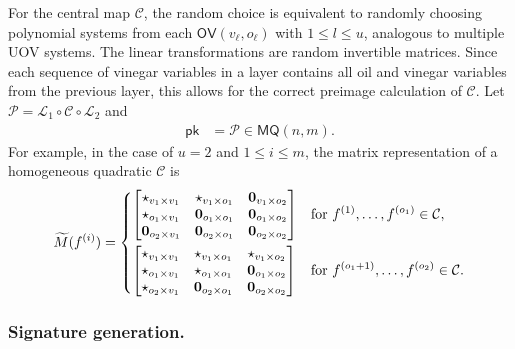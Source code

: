 \documentclass[12pt, a4paper, oneside]{memoir}
\theoremstyle{definition}
\begin{document}
For the central map $\mathcal{C}$, the random choice is equivalent to randomly choosing polynomial systems from each $\mathsf{OV}(v_{\ell}, o_{\ell})$ with $1 \leq l \leq u$, analogous to multiple UOV systems. The linear transformations are random invertible matrices. Since each sequence of vinegar variables in a layer contains all oil and vinegar variables from the previous layer, this allows for the correct preimage calculation of $\mathcal{C}$. Let $\mathcal{P} = \mathcal{L}_{1} \circ \mathcal{C} \circ \mathcal{L}_{2}$ and
\begin{align}\label{eq:pk-rainbow}
  \mathsf{pk} &= \mathcal{P} \in \mathsf{MQ}(n, m).
\end{align}
For example, in the case of $u = 2$ and $1 \leq i \leq m$, the matrix representation of a homogeneous quadratic $\mathcal{C}$ is
\begin{align}
  \widetilde{M}(f^{(i)}) =
  \begin{dcases}
    \begin{bmatrix}
      \star_{v_{1} \times v_{1}}      & \star_{v_{1} \times o_{1}}      & \mathbf{0}_{v_{1} \times o_{2}} \\
      \star_{o_{1} \times v_{1}}      & \mathbf{0}_{o_{1} \times o_{1}} & \mathbf{0}_{o_{1} \times o_{2}} \\
      \mathbf{0}_{o_{2} \times v_{1}} & \mathbf{0}_{o_{2} \times o_{1}} & \mathbf{0}_{o_{2} \times o_{2}} \\
    \end{bmatrix} & \text{for } f^{(1)}, \dots, f^{(o_{1})} \in \mathcal{C}, \\
    \begin{bmatrix}
      \star_{v_{1} \times v_{1}}      & \star_{v_{1} \times o_{1}}      & \star_{v_{1} \times o_{2}} \\
      \star_{o_{1} \times v_{1}}      & \star_{o_{1} \times o_{1}}      & \mathbf{0}_{o_{1} \times o_{2}} \\
      \star_{o_{2} \times v_{1}}      & \mathbf{0}_{o_{2} \times o_{1}} & \mathbf{0}_{o_{2} \times o_{2}} \\
    \end{bmatrix} & \text{for } f^{(o_{1} + 1)}, \dots, f^{(o_{2})} \in \mathcal{C}.
  \end{dcases}
\end{align}

\subsubsection{Signature generation.}
\end{document}
